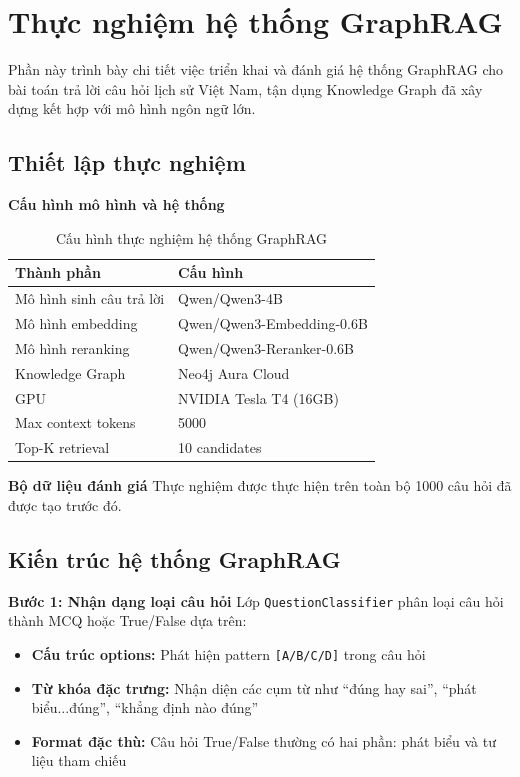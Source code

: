 \section{Thực nghiệm hệ thống GraphRAG}
\label{sec:experiment4}

Phần này trình bày chi tiết việc triển khai và đánh giá hệ thống GraphRAG cho bài toán trả lời câu hỏi lịch sử Việt Nam, tận dụng Knowledge Graph đã xây dựng kết hợp với mô hình ngôn ngữ lớn.

\subsection{Thiết lập thực nghiệm}

\textbf{Cấu hình mô hình và hệ thống}

\begin{table}[H]
\centering
\caption{Cấu hình thực nghiệm hệ thống GraphRAG}
\label{tab:graphrag-config}
\begin{tabular}{|l|l|}
\hline
\textbf{Thành phần} & \textbf{Cấu hình} \\
\hline
Mô hình sinh câu trả lời & Qwen/Qwen3-4B \\
Mô hình embedding & Qwen/Qwen3-Embedding-0.6B \\
Mô hình reranking & Qwen/Qwen3-Reranker-0.6B \\
Knowledge Graph & Neo4j Aura Cloud \\
GPU & NVIDIA Tesla T4 (16GB) \\
Max context tokens & 5000 \\
Top-K retrieval & 10 candidates \\
\hline
\end{tabular}
\end{table}

\textbf{Bộ dữ liệu đánh giá}
Thực nghiệm được thực hiện trên toàn bộ 1000 câu hỏi đã được tạo trước đó.

\subsection{Kiến trúc hệ thống GraphRAG}
\label{subsec:graphrag-architecture}

\textbf{Bước 1: Nhận dạng loại câu hỏi}
Lớp \texttt{QuestionClassifier} phân loại câu hỏi thành MCQ hoặc True/False dựa trên:
\begin{itemize}
    \item \textbf{Cấu trúc options:} Phát hiện pattern \texttt{[A/B/C/D]} trong câu hỏi
    \item \textbf{Từ khóa đặc trưng:} Nhận diện các cụm từ như ``đúng hay sai'', ``phát biểu...đúng'', ``khẳng định nào đúng''
    \item \textbf{Format đặc thù:} Câu hỏi True/False thường có hai phần: phát biểu và tư liệu tham chiếu
\end{itemize}

